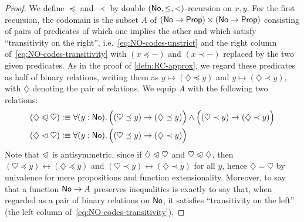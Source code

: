 \newcommand{\hle}{\diamondsuit\preceq}
\newcommand{\hlt}{\diamondsuit\prec}
\newcommand{\hlname}{\diamondsuit}
\newcommand{\hleb}{\heartsuit\preceq}
\newcommand{\hltb}{\heartsuit\prec}
\newcommand{\hlbname}{\heartsuit}
\newcommand{\tle}{\triangle\preceq}
\newcommand{\tlt}{\triangle\prec}
\newcommand{\tlname}{\triangle}
\newcommand{\tleb}{\square\preceq}
\newcommand{\tltb}{\square\prec}
\newcommand{\tlbname}{\square}
\begin{proof}
  We define $\preceq$ and $\prec$ by double $(\mathsf{No},\le,<)$-recursion on $x,y$.
  For the first recursion, the codomain is the subset $A$ of $(\mathsf{No}\to\mathsf{Prop})\times (\mathsf{No}\to\mathsf{Prop})$ consisting of pairs of predicates of which one implies the other and which satisfy ``transitivity on the right'', i.e.~\eqref{eq:NO-codes-unstrict} and the right column of~\eqref{eq:NO-codes-transitivity} with $(x\preceq -)$ and $(x\prec -)$ replaced by the two given predicates.
  As in the proof of \autoref{defn:RC-approx}, we regard these predicates as half of binary relations, writing them as $y\mapsto (\hle y)$ and $y\mapsto (\hlt y)$, with $\hlname$ denoting the pair of relations.
  We equip $A$ with the following two relations:
  \begin{align*}
    (\hlname \ble \hlbname) &\defeq
    \fall{y:\NO} \Big( (\hleb y) \to (\hle y) \Big) \land
    \Big( (\hltb y) \to (\hlt y) \Big)\\
    (\hlname \blt \hlbname) &\defeq
    \fall{y:\NO} \Big( (\hleb y) \to (\hlt y) \Big)
  \end{align*}
  Note that $\trianglelefteqslant$ is antisymmetric, since if $\hlname \ble \hlbname$ and $\hlbname \ble \hlname$, then $(\hleb y) \leftrightarrow (\hle y)$ and $(\hltb y) \leftrightarrow (\hlt y)$ for all $y$, hence $\hlname=\hlbname$ by univalence for mere propositions and function extensionality.
  Moreover, to say that a function $\mathsf{No}\to A$ preserves inequalities is exactly to say that, when regarded as a pair of binary relations on $\mathsf{No}$, it satisfies ``transitivity on the left'' (the left column of~\eqref{eq:NO-codes-transitivity}).


\end{proof}
